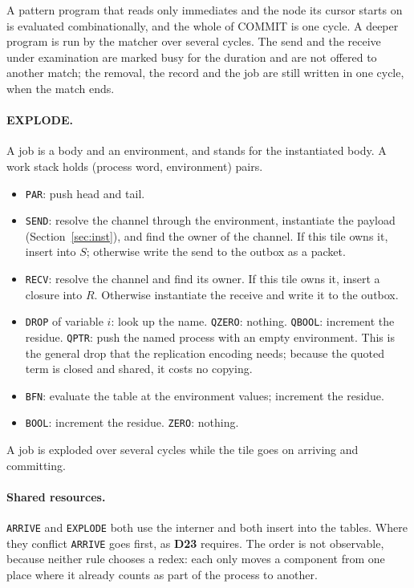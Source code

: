 \documentclass[10.5pt,a4paper]{extarticle}
\newcommand{\kw}[1]{\texttt{#1}}
\newcommand{\dec}[1]{\textbf{D#1}}
\theoremstyle{definition}
\theoremstyle{remark}
\begin{document}
A pattern program that reads only immediates and the node its cursor starts
on is evaluated combinationally, and the whole of COMMIT is one cycle. A
deeper program is run by the matcher over several cycles. The send and the
receive under examination are marked busy for the duration and are not
offered to another match; the removal, the record and the job are still
written in one cycle, when the match ends.

\paragraph{EXPLODE.} A job is a body and an environment, and stands for the
instantiated body. A work stack holds (process word, environment) pairs.
\begin{itemize}
\item \kw{PAR}: push head and tail.
\item \kw{SEND}: resolve the channel through the environment, instantiate
the payload (Section~\ref{sec:inst}), and find the owner of the channel. If
this tile owns it, insert into $S$; otherwise write the send to the outbox
as a packet.
\item \kw{RECV}: resolve the channel and find its owner. If this tile owns
it, insert a closure into $R$. Otherwise instantiate the receive and write it
to the outbox.
\item \kw{DROP} of variable $i$: look up the name. \kw{QZERO}: nothing.
\kw{QBOOL}: increment the residue. \kw{QPTR}: push the named process with an
empty environment. This is the general drop that the replication encoding
needs; because the quoted term is closed and shared, it costs no copying.
\item \kw{BFN}: evaluate the table at the environment values; increment the
residue.
\item \kw{BOOL}: increment the residue. \kw{ZERO}: nothing.
\end{itemize}
A job is exploded over several cycles while the tile goes on arriving and
committing.

\paragraph{Shared resources.} \kw{ARRIVE} and \kw{EXPLODE} both use the
interner and both insert into the tables. Where they conflict \kw{ARRIVE}
goes first, as \dec{23} requires. The order is not observable, because
neither rule chooses a redex: each only moves a component from one place
where it already counts as part of the process to another.
\end{document}
